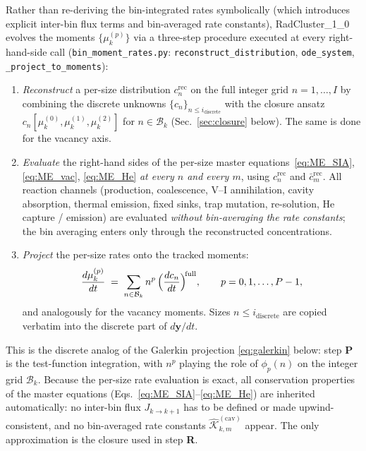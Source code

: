Rather than re-deriving the bin-integrated rates symbolically (which
introduces explicit inter-bin flux terms and bin-averaged rate
constants), RadCluster\_1\_0 evolves the moments
$\{\mu_k^{(p)}\}$ via a three-step procedure executed at every
right-hand-side call (\texttt{bin\_moment\_rates.py}:
\texttt{reconstruct\_distribution}, \texttt{ode\_system},
\texttt{\_project\_to\_moments}):
\begin{enumerate}
  \item[\textbf{R.}] \textit{Reconstruct} a per-size distribution
        $c_n^{\mathrm{rec}}$ on the full integer grid
        $n = 1, \ldots, I$ by combining the discrete unknowns
        $\{c_n\}_{n \le i_{\mathrm{discrete}}}$ with the closure
        ansatz $c_n[\mu_k^{(0)},\mu_k^{(1)},\mu_k^{(2)}]$ for
        $n \in \mathcal{B}_k$ (Sec.~\ref{sec:closure} below). The
        same is done for the vacancy axis.
  \item[\textbf{E.}] \textit{Evaluate} the right-hand sides of the
        per-size master equations~\eqref{eq:ME_SIA},
        \eqref{eq:ME_vac}, \eqref{eq:ME_He}
        \emph{at every $n$ and every $m$}, using
        $c_n^{\mathrm{rec}}$ and $\bar{c}_m^{\mathrm{rec}}$. All
        reaction channels (production, coalescence, V--I annihilation,
        cavity absorption, thermal emission, fixed sinks, trap
        mutation, re-solution, He capture / emission) are evaluated
        \emph{without bin-averaging the rate constants}; the bin
        averaging enters only through the reconstructed concentrations.
  \item[\textbf{P.}] \textit{Project} the per-size rates onto the
        tracked moments:
        \begin{equation}\label{eq:projection}
          \frac{d\mu_k^{(p)}}{dt} \;=\;
          \sum_{n \in \mathcal{B}_k}
            n^p\,\Bigl(\frac{dc_n}{dt}\Bigr)^{\!\mathrm{full}},
          \qquad p = 0, 1, \ldots, P-1,
        \end{equation}
        and analogously for the vacancy moments. Sizes
        $n \le i_{\mathrm{discrete}}$ are copied verbatim into the
        discrete part of $d\mathbf{y}/dt$.
\end{enumerate}
This is the discrete analog of the Galerkin projection
\eqref{eq:galerkin} below: step \textbf{P} is the test-function
integration, with $n^p$ playing the role of $\phi_p(n)$ on the integer
grid $\mathcal{B}_k$. Because the per-size rate evaluation is
exact, all conservation properties of the master equations
(Eqs.~\ref{eq:ME_SIA}--\ref{eq:ME_He}) are inherited automatically: no
inter-bin flux $J_{k \to k+1}$ has to be defined or made
upwind-consistent, and no bin-averaged rate constants
$\hat{\mathcal{K}}_{k,m}^{(\mathrm{cav})}$ appear. The only
approximation is the closure used in step \textbf{R}.

